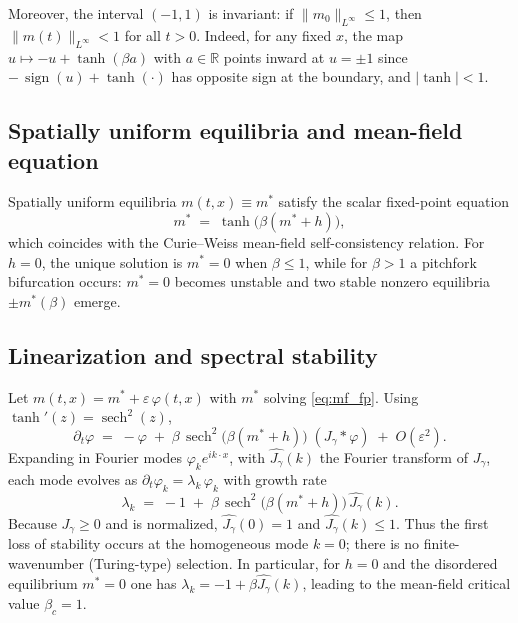 \documentclass[11pt,a4paper]{article}
\begin{document}
Moreover, the interval $(-1,1)$ is invariant: if $\|m_0\|_{L^\infty}\le 1$, then $\|m(t)\|_{L^\infty}<1$ for all $t>0$. Indeed, for any fixed $x$, the map $u\mapsto -u+\tanh(\beta a)$ with $a\in\mathbb{R}$ points inward at $u=\pm1$ since $-\,\operatorname{sign}(u)+\tanh(\cdot)$ has opposite sign at the boundary, and $|\tanh|<1$.

\subsection{Spatially uniform equilibria and mean-field equation}
Spatially uniform equilibria $m(t,x)\equiv m^*$ satisfy the scalar fixed-point equation
\begin{equation}\label{eq:mf_fp}
 m^* \;=\; \tanh\big(\beta(m^* + h)\big),
\end{equation}
which coincides with the Curie--Weiss mean-field self-consistency relation. For $h=0$, the unique solution is $m^*=0$ when $\beta\le1$, while for $\beta>1$ a pitchfork bifurcation occurs: $m^*=0$ becomes unstable and two stable nonzero equilibria $\pm m^*(\beta)$ emerge.

\subsection{Linearization and spectral stability}
Let $m(t,x)=m^*+\varepsilon\,\varphi(t,x)$ with $m^*$ solving \eqref{eq:mf_fp}. Using $\tanh'(z)=\operatorname{sech}^2(z)$,
\[
\partial_t \varphi \;=\; -\varphi\; +\; \beta\,\operatorname{sech}^2\!\big(\beta(m^*+h)\big)\; (J_\gamma*\varphi)\; +\; O(\varepsilon^2).
\]
Expanding in Fourier modes $\varphi_k e^{i k\cdot x}$, with $\widehat{J_\gamma}(k)$ the Fourier transform of $J_\gamma$, each mode evolves as $\partial_t \varphi_k = \lambda_k\,\varphi_k$ with growth rate
\begin{equation}\label{eq:lin_rate}
 \lambda_k \;=\; -1\; +\; \beta\,\operatorname{sech}^2\!\big(\beta(m^*+h)\big)\,\widehat{J_\gamma}(k).
\end{equation}
Because $J_\gamma\ge0$ and is normalized, $\widehat{J_\gamma}(0)=1$ and $\widehat{J_\gamma}(k)\le1$. Thus the first loss of stability occurs at the homogeneous mode $k=0$; there is no finite-wavenumber (Turing-type) selection. In particular, for $h=0$ and the disordered equilibrium $m^*=0$ one has $\lambda_k = -1 + \beta\widehat{J_\gamma}(k)$, leading to the mean-field critical value $\beta_c=1$.
\end{document}
